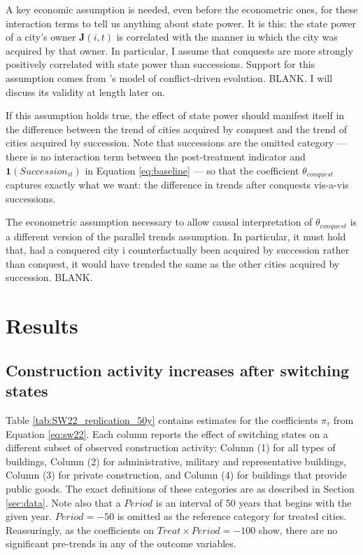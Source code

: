 \documentclass[11pt, a4paper]{article}
\begin{document}
A key economic assumption is needed, even before the econometric ones, for these interaction terms to tell us anything about state power. It is this: the state power of a city's owner $\mathbf{J}(i, t)$ is correlated with the manner in which the city was acquired by that owner. In particular, I assume that conquests are more strongly positively correlated with state power than successions. Support for this assumption comes from \cite{levine2021}'s model of conflict-driven evolution. BLANK. I will discuss its validity at length later on.

If this assumption holds true, the effect of state power should manifest itself in the difference between the trend of cities acquired by conquest and the trend of cities acquired by succession. Note that successions are the omitted category --- there is no interaction term between the post-treatment indicator and $\mathbf{1}(Succession_{it})$ in Equation \eqref{eq:baseline} --- so that the coefficient $\theta_{conquest}$ captures exactly what we want: the difference in trends after conquests vis-a-vis successions.

The econometric assumption necessary to allow causal interpretation of $\theta_{conquest}$ is a different version of the parallel trends assumption. In particular, it must hold that, had a conquered city i counterfactually been acquired by succession rather than conquest, it would have trended the same as the other cities acquired by succession. BLANK.



\section{Results} \label{sec:results}

\subsection{Construction activity increases after switching states}

Table \ref{tab:SW22_replication_50y} contains estimates for the coefficients $\pi_\tau$ from Equation \eqref{eq:sw22}. Each column reports the effect of switching states on a different subset of observed construction activity: Column (1) for all types of buildings, Column (2) for administrative, military and representative buildings, Column (3) for private construction, and Column (4) for buildings that provide public goods. The exact definitions of these categories are as described in Section \ref{sec:data}. Note also that a $Period$ is an interval of 50 years that begins with the given year. $Period = -50$ is omitted as the reference category for treated cities. Reassuringly, as the coefficients on $Treat \times Period = -100$ show, there are no significant pre-trends in any of the outcome variables. 
\end{document}
